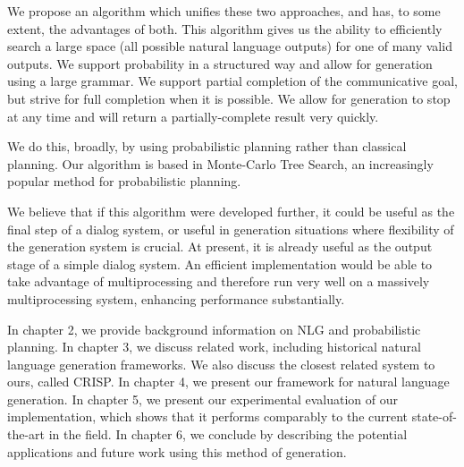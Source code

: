 We propose an algorithm which unifies these two approaches, and has, to some extent,
the advantages of both.  This algorithm gives
us the ability to efficiently search a large space (all possible natural language outputs) for 
one of many valid outputs.  We support probability in a structured way and allow
for generation using a large grammar.  We support partial completion of the communicative
goal, but strive for full completion when it is possible.  We allow for generation to stop
at any time and will return a partially-complete result very quickly.

We do this, broadly, by using probabilistic planning rather than classical planning.
Our algorithm is based in Monte-Carlo Tree Search, an increasingly
popular method for probabilistic planning.

We believe that if this algorithm were developed further, it could be useful as the
final step of a dialog system, or useful in generation situations where flexibility of the
generation system is crucial.  At present, it is already useful as the output stage of
a simple dialog system.  An efficient implementation would be able to take advantage
of multiprocessing and therefore run very well on a massively multiprocessing system,
enhancing performance substantially.

In chapter 2, we provide background information on NLG and probabilistic planning.  In chapter 3,
we discuss related work, including historical natural language generation frameworks.  We also
discuss the closest related system to ours, called CRISP.  In chapter 4, we present our framework
for natural language generation.  In chapter 5, we present our experimental evaluation of
our implementation, which shows that it performs comparably to the current state-of-the-art in
the field.  In chapter 6, we conclude by describing the potential applications and future work
using this method of generation.